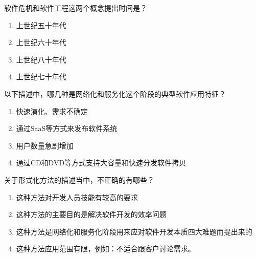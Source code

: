 \begin{problem}
    软件危机和软件工程这两个概念提出时间是？
    \vspace{-0.8em}
    \begin{multicols}{4}
        \begin{enumerate}[label=\Alph*.]
            \item 上世纪五十年代
            \item 上世纪六十年代
            \item 上世纪八十年代
            \item 上世纪七十年代
        \end{enumerate}
    \end{multicols}
    \vspace{-1em}
\end{problem}



\begin{problem}
    ‍以下描述中，哪几种是网络化和服务化这个阶段的典型软件应用特征？
        \begin{enumerate}[label=\Alph*.]
            \item 快速演化、需求不确定
            \item 通过SaaS等方式来发布软件系统
            \item 用户数量急剧增加
            \item 通过CD和DVD等方式支持大容量和快速分发软件拷贝
        \end{enumerate}
\end{problem}


\begin{problem}
    ‌关于形式化方法的描述当中，不正确的有哪些？
        \begin{enumerate}[label=\Alph*.]
            \item 这种方法对开发人员技能有较高的要求
            \item 这种方法的主要目的是解决软件开发的效率问题
            \item 这种方法是网络化和服务化阶段用来应对软件开发本质四大难题而提出来的
            \item 这种方法应用范围有限，例如：不适合跟客户讨论需求。
        \end{enumerate}
\end{problem}



